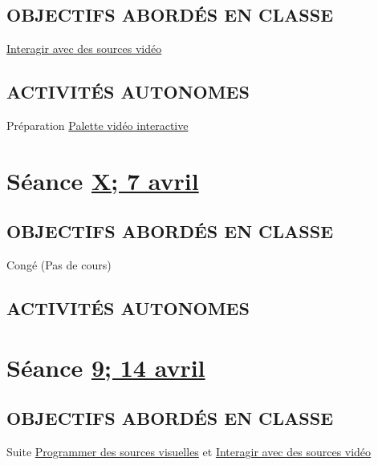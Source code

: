 \documentclass[
]{book}
\begin{document}
\hypertarget{objectifs-aborduxe9s-en-classe-8}{%
\subsection{OBJECTIFS ABORDÉS EN CLASSE}\label{objectifs-aborduxe9s-en-classe-8}}

\protect\hyperlink{interagir}{Interagir avec des sources vidéo}

\hypertarget{activituxe9s-autonomes-8}{%
\subsection{ACTIVITÉS AUTONOMES}\label{activituxe9s-autonomes-8}}

Préparation \protect\hyperlink{sommatif_4}{Palette vidéo interactive}

\hypertarget{semaine_10}{%
\section{\texorpdfstring{Séance \protect\hyperlink{semaine_10}{X; 7 avril}}{Séance X; 7 avril}}\label{semaine_10}}

\hypertarget{objectifs-aborduxe9s-en-classe-9}{%
\subsection{OBJECTIFS ABORDÉS EN CLASSE}\label{objectifs-aborduxe9s-en-classe-9}}

Congé (Pas de cours)

\hypertarget{activituxe9s-autonomes-9}{%
\subsection{ACTIVITÉS AUTONOMES}\label{activituxe9s-autonomes-9}}

\hypertarget{semaine_11}{%
\section{\texorpdfstring{Séance \protect\hyperlink{semaine_11}{9; 14 avril}}{Séance 9; 14 avril}}\label{semaine_11}}

\hypertarget{objectifs-aborduxe9s-en-classe-10}{%
\subsection{OBJECTIFS ABORDÉS EN CLASSE}\label{objectifs-aborduxe9s-en-classe-10}}

Suite \protect\hyperlink{programmer}{Programmer des sources visuelles}
et \protect\hyperlink{interagir}{Interagir avec des sources vidéo}
\end{document}
